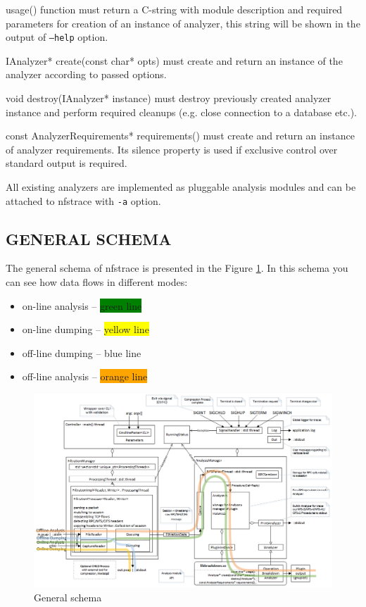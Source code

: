 \documentclass{article}
\newcommand*{\textfile}[1]{\textsf{#1}}
\newcommand*{\textprog}[1]{\textfile{#1}}
\newcommand{\code}[1]{\texttt{#1}}
\begin{document}
\textprog{usage()} function must return a C-string with module description and
required parameters for creation of an instance of analyzer, this string will
be shown in the output of \code{--help} option.

\textprog{IAnalyzer* create(const char* opts)} must create and return an instance
of the analyzer according to passed options.  

\textprog{void destroy(IAnalyzer* instance)} must destroy previously created
analyzer instance and perform required cleanups (e.g. close connection to a
database etc.).

\textprog{const AnalyzerRequirements* requirements()} must create and return an
instance of analyzer requirements. Its silence property is used if exclusive
control over standard output is required.

All existing analyzers are implemented as pluggable analysis modules and can be
attached to \textprog{nfstrace} with \code{-a} option.

\subsection{GENERAL SCHEMA}

\begin{minipage}[t]{\linewidth}
The general schema of \textprog{nfstrace} is presented in the Figure \ref{fig:generalschema}.
In this schema you can see how data flows in different modes: 
\begin{itemize}
    \item on-line analysis –  \colorbox{green}{green line}
    \item on-line dumping –  \colorbox{yellow}{yellow line}
    \item off-line dumping –  \colorbox{ProcessBlue}{blue line}
    \item off-line analysis –  \colorbox{orange}{orange line}
\end{itemize} 
\end{minipage}

\newpage

\begin{figure}
\includegraphics[width=\linewidth]{./pictures/general-structure.png}
\caption{General schema}
\label{General schema}
\centering
\label{fig:generalschema}
\end{figure}

\clearpage

\printglossaries 
\end{document}
